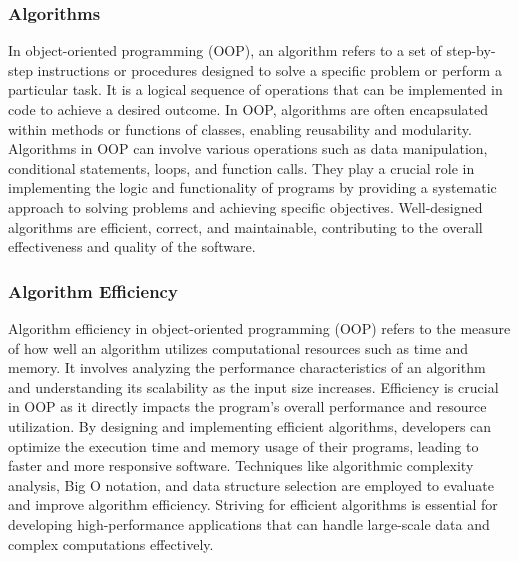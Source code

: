 \subsubsection*{Algorithms}

In object-oriented programming (OOP), an algorithm refers to a set of step-by-step instructions or procedures designed to solve a specific problem or perform a particular task. It is a logical sequence of operations that can be implemented in code to achieve a desired outcome. In OOP, algorithms are often encapsulated within 
methods or functions of classes, enabling reusability and modularity. Algorithms in OOP can involve various operations such as data manipulation, conditional statements, loops, and function calls. They play a crucial role in implementing the logic and functionality of programs by providing a systematic approach to solving problems 
and achieving specific objectives. Well-designed algorithms are efficient, correct, and maintainable, contributing to the overall effectiveness and quality of the software. \\

\subsubsection*{Algorithm Efficiency}

Algorithm efficiency in object-oriented programming (OOP) refers to the measure of how well an algorithm utilizes computational resources such as time and memory. It involves analyzing the performance characteristics of an algorithm and understanding its scalability as the input size increases. Efficiency is crucial in OOP as it 
directly impacts the program's overall performance and resource utilization. By designing and implementing efficient algorithms, developers can optimize the execution time and memory usage of their programs, leading to faster and more responsive software. Techniques like algorithmic complexity analysis, Big O notation, and data 
structure selection are employed to evaluate and improve algorithm efficiency. Striving for efficient algorithms is essential for developing high-performance applications that can handle large-scale data and complex computations effectively. \\

